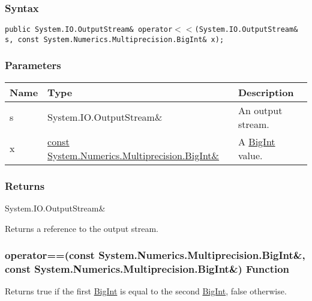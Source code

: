 \documentclass[a4paper,oneside,11.000000pt]{book}
\begin{document}
\subsubsection*{Syntax}
\texttt{public System.IO.OutputStream\& operator$<$$<$(System.IO.OutputStream\& s, const System.Numerics.Multiprecision.BigInt\& x);}
\subsubsection*{Parameters}
\begin{flushleft}
\begin{supertabular}[l]{!{\raggedright}p{1.30721cm}!{\raggedright}p{8.55945cm}!{\raggedright}p{4.49442cm}}
\textbf{Name}
& \textbf{Type}
& \textbf{Description}
\\
\hline
s
& System.\-IO.\-OutputStream\&\-
& An output stream.

\\
x
& \hyperlink{System.Numerics.Multiprecision.BigInt}{const System.\-Numerics.\-Multiprecision.\-BigInt\&\-}
& A \hyperlink{System.Numerics.Multiprecision.BigInt}{BigInt} value.

\\
\end{supertabular}

\end{flushleft}
\subsubsection*{Returns}System.\-IO.\-OutputStream\&\-
\begin{flushleft}
Returns a reference to the output stream.

\end{flushleft}
\clearpage

\hypertarget{System.Numerics.Multiprecision.operator.equal.C.R.System.Numerics.Multiprecision.BigInt.C.R.System.Numerics.Multiprecision.BigInt}{\subsubsection*{operator==(const System.Numerics.Multiprecision.BigInt\&, const System.Numerics.Multiprecision.BigInt\&) Function}}
\begin{flushleft}
Returns true if the first \hyperlink{System.Numerics.Multiprecision.BigInt}{BigInt} is equal to the second \hyperlink{System.Numerics.Multiprecision.BigInt}{BigInt}, false otherwise.

\end{flushleft}
\end{document}
